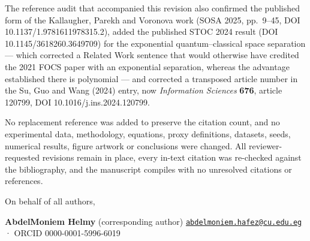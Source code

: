 \documentclass[
  11pt,
]{article}
\begin{document}
The reference audit that accompanied this revision also confirmed the
published form of the Kallaugher, Parekh and Voronova work (SOSA 2025,
pp.~9--45, DOI 10.1137/1.9781611978315.2), added the published STOC 2024
result (DOI 10.1145/3618260.3649709) for the exponential
quantum--classical space separation --- which corrected a Related Work
sentence that would otherwise have credited the 2021 FOCS paper with an
exponential separation, whereas the advantage established there is
polynomial --- and corrected a transposed article number in the Su, Guo
and Wang (2024) entry, now \emph{Information Sciences} \textbf{676},
article 120799, DOI 10.1016/j.ins.2024.120799.

No replacement reference was added to preserve the citation count, and
no experimental data, methodology, equations, proxy definitions,
datasets, seeds, numerical results, figure artwork or conclusions were
changed. All reviewer-requested revisions remain in place, every in-text
citation was re-checked against the bibliography, and the manuscript
compiles with no unresolved citations or references.

On behalf of all authors,

\textbf{AbdelMoniem Helmy} (corresponding author)
\href{mailto:abdelmoniem.hafez@cu.edu.eg}{\nolinkurl{abdelmoniem.hafez@cu.edu.eg}}
· ORCID 0000-0001-5996-6019
\end{document}
